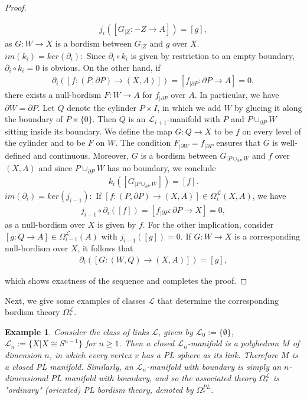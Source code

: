 \documentclass{scrreprt}
\newtheorem{example}[prop]{Example}
\begin{document}
\begin{proof}
\begin{itemize}
\begin{align*}
j_i([G_{|Z}: -Z \to A]) = [g],
\end{align*}
as $G: W \to X$ is a bordism between $G_{|Z}$ and $g$ over $X$. \\
$im(k_i)=ker(\partial_i):$ Since $\partial_i \circ k_i$ is given by restriction to an empty boundary, $\partial_i \circ k_i=0$ is obvious. On the other hand, if 
\begin{align*}
\partial_i([f:(P, \partial P) \to (X,A)])= [f_{| \partial P} : \partial P \to A] = 0,
\end{align*}
there exists a null-bordism $F: W \to A$ for $f_{| \partial P}$ over $A$. In particular, we have $\partial W= \partial P$. Let $Q$ denote the cylinder $P \times I$, in which we add $W$ by glueing it along the boundary of $P \times \{ 0 \}$. Then $Q$ is an $\mathcal{L}_{i+1}$-manifold with $P$ and $P \cup_{\partial P} W$ sitting inside its boundary. We define the map $G: Q \to X$ to be $f$ on every level of the cylinder and to be $F$ on $W$. The condition $F_{| \partial W}=f_{| \partial P}$ ensures that $G$ is well-defined and continuous. Moreover, $G$ is a bordism between $G_{|P \cup_{\partial P} W}$ and $f$ over $(X,A)$ and since $P \cup_{\partial P} W$ has no boundary, we conclude 
\begin{align*}
k_i([G_{|P \cup_{\partial P} W}])=[f].
\end{align*}
$im(\partial_i)= ker(j_{i-1}):$ If $[f:(P, \partial P) \to (X,A)] \in \Omega_{i}^{\mathcal{L}}(X,A)$, we have 
\begin{align*}
j_{i-1} \circ \partial_i ([f])= [f_{| \partial P}: \partial P \to X] = 0,
\end{align*}
as a null-bordism over $X$ is given by $f$. For the other implication, consider $[g: Q \to A] \in \Omega_{i-1}^{\mathcal{L}}(A)$ with $j_{i-1}([g])=0$. If $G: W \to X$ is a corresponding null-bordism over $X$, it follows that
\begin{align*}
\partial_i([G: (W,Q) \to (X,A)]) = [g],
\end{align*}
\end{itemize}
which shows exactness of the sequence and completes the proof.
\end{proof}

Next, we give some examples of classes $\mathcal{L}$ that determine the corresponding bordism theory $\Omega_*^{\mathcal{L}}$.

\begin{example}
Consider the class of links $\mathcal{L}$, given by $\mathcal{L}_0 := \{ \emptyset \}$, $\mathcal{L}_n:= \{ X | X \cong S^{n-1} \}$ for $n \geq 1$. Then a closed $\mathcal{L}_n$-manifold is a polyhedron $M$ of dimension $n$, in which every vertex $v$ has a PL sphere as its link. Therefore $M$ is a closed PL manifold. Similarly, an $\mathcal{L}_n$-manifold with boundary is simply an $n$-dimensional PL manifold with boundary, and so the associated theory $\Omega_*^{\mathcal{L}}$ is "ordinary" (oriented) PL bordism theory, denoted by $\Omega_*^{PL}$.
\end{example}
\end{document}
